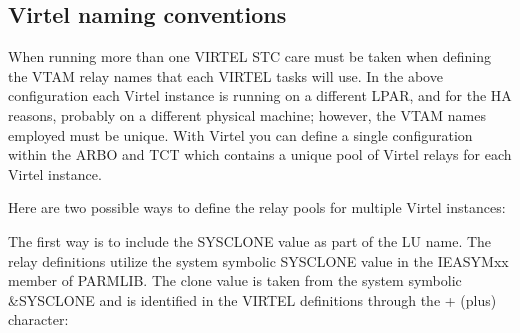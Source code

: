 \documentclass[letterpaper,10pt,english]{sphinxmanual}
\begin{document}
\newpage


\subsection{Virtel naming conventions}
\label{\detokenize{connectivity_guide:virtel-naming-conventions}}
\sphinxAtStartPar
When running more than one VIRTEL STC care must be taken when defining the VTAM relay names that each VIRTEL tasks will use. In the above configuration each Virtel instance is running on a different LPAR, and for the HA reasons, probably on a different physical machine; however, the VTAM names employed must be unique. With Virtel you can define a
single configuration within the ARBO and TCT which contains a unique pool of Virtel relays for each Virtel instance.

\sphinxAtStartPar
Here are two possible ways to define the relay pools for multiple Virtel instances:

\sphinxAtStartPar
The first way is to include the SYSCLONE value as part of the LU name. The relay definitions utilize the system symbolic SYSCLONE value in the IEASYMxx member of PARMLIB. The clone value is taken from the system symbolic \&SYSCLONE and is identified in the VIRTEL definitions through the + (plus) character:

\begin{sphinxVerbatim}[commandchars=\\\{\}]
      
                             
                                    
                            
                                    
                            
                             
                                   
\end{sphinxVerbatim}
\end{document}
